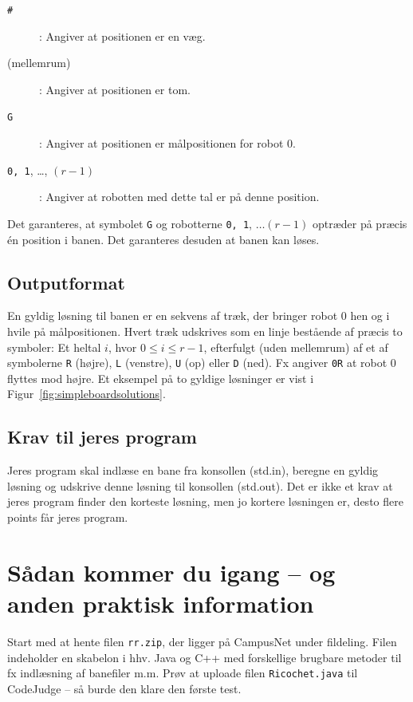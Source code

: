 \documentclass[10pt,a4paper]{article}
\begin{document}
\begin{description}
\item[\texttt{\#}]: Angiver at positionen er en væg.
\item[(mellemrum)]: Angiver at positionen er tom.
\item[\texttt{G}]: Angiver at positionen er målpositionen for robot 0.
\item[\texttt{0, 1}, \ldots, $(r-1)$]: Angiver at robotten med dette tal er på denne position.
\end{description}
Det garanteres, at symbolet \texttt{G} og robotterne \texttt{0, 1}, $\ldots (r-1)$ optræder på præcis én position i banen. Det garanteres desuden at banen kan løses.

\subsection{Outputformat}
En gyldig løsning til banen er en sekvens af træk, der bringer robot 0 hen og i hvile på målpositionen. Hvert træk udskrives som en linje bestående af præcis to symboler: Et heltal $i$, hvor $0 \leq i \leq r-1$, efterfulgt (uden mellemrum) af et af symbolerne \texttt{R} (højre), \texttt{L} (venstre), \texttt{U} (op) eller \texttt{D} (ned). Fx angiver \texttt{0R} at robot 0 flyttes mod højre. Et eksempel på to gyldige løsninger er vist i Figur~\ref{fig:simpleboardsolutions}.

\subsection{Krav til jeres program}
Jeres program skal indlæse en bane fra konsollen (std.in), beregne en gyldig løsning og udskrive denne løsning til konsollen (std.out). Det er ikke et krav at jeres program finder den korteste løsning, men jo kortere løsningen er, desto flere points får jeres program.





\section{Sådan kommer du igang -- og anden praktisk information}

Start med at hente filen \texttt{rr.zip}, der ligger på CampusNet under fildeling. Filen indeholder en skabelon i hhv. Java og C++ med forskellige brugbare metoder til fx indlæsning af banefiler m.m. Prøv at uploade filen \texttt{Ricochet.java} til CodeJudge -- så burde den klare den første test.
\end{document}

